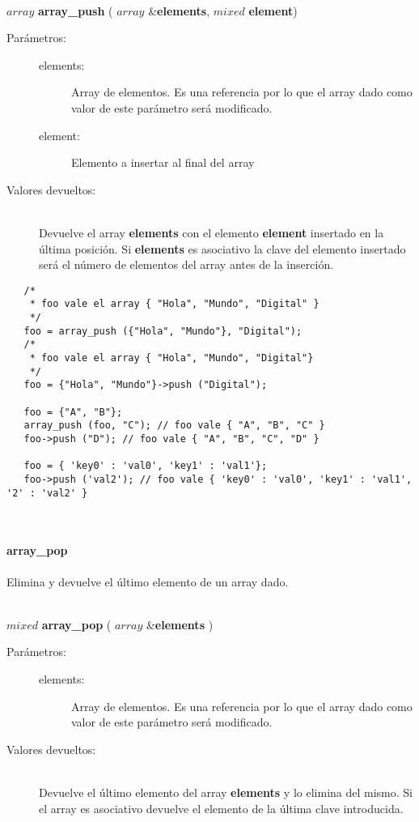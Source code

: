 \hfill \\ $array$ \textbf{array\_push} ( $array$ \&\textbf{elements}, $mixed$ \textbf{element})  
\begin{description}
\item [Parámetros:] \hfill 
   \begin{description}
   \item[elements:] Array de elementos. Es una referencia por lo que el array dado como valor de este parámetro será modificado. 
   \item[element:] Elemento a insertar al final del array
   \end{description}
\item[Valores devueltos:] \hfill \\
   Devuelve el array \textbf{elements} con el elemento \textbf{element} insertado en la última posición. Si \textbf{elements} es
   asociativo la clave del elemento insertado será el número de elementos del array antes de la inserción. 
\end{description}
     
\begin{lstlisting}   
   /*
    * foo vale el array { "Hola", "Mundo", "Digital" }
    */
   foo = array_push ({"Hola", "Mundo"}, "Digital"); 
   /*
    * foo vale el array { "Hola", "Mundo", "Digital"}
    */
   foo = {"Hola", "Mundo"}->push ("Digital");
   
   foo = {"A", "B"};
   array_push (foo, "C"); // foo vale { "A", "B", "C" }
   foo->push ("D"); // foo vale { "A", "B", "C", "D" }
   
   foo = { 'key0' : 'val0', 'key1' : 'val1'};
   foo->push ('val2'); // foo vale { 'key0' : 'val0', 'key1' : 'val1', '2' : 'val2' }
\end{lstlisting}
\hfill\\ 

\paragraph{array\_pop}
Elimina y devuelve el último elemento de un array dado. 

\hfill \\ $mixed$ \textbf{array\_pop} ( $array$ \&\textbf{elements} )  
\begin{description}
\item [Parámetros:] \hfill 
   \begin{description}
   \item[elements:] Array de elementos. Es una referencia por lo que el array dado como valor de este parámetro será modificado. 
   \end{description}
\item[Valores devueltos:] \hfill \\
   Devuelve el último elemento del array \textbf{elements} y lo elimina del mismo. Si el array es asociativo devuelve el
   elemento de la última clave introducida.
\end{description}
     
